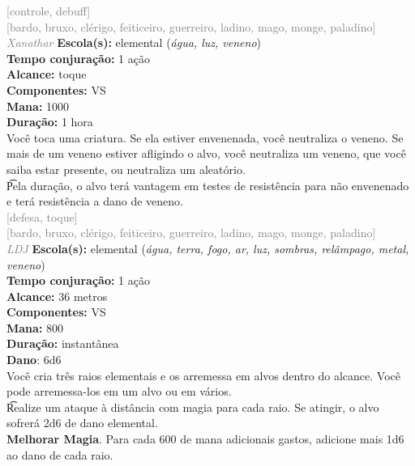 \documentclass{RPG_Adventure}[2021/10/20]
\begin{document}
{\scriptsize \textcolor{gray}{[controle, debuff]\\}}
{\scriptsize \textcolor{gray}{[bardo, bruxo, clérigo, feiticeiro, guerreiro, ladino, mago, monge, paladino]\\}}
{\tiny \textcolor{gray}{\textit{Xanathar}}}
{\small \t \textbf{Escola(s):} elemental (\textit{água, luz, veneno})\\\t \textbf{Tempo conjuração:} 1 ação\\\t \textbf{Alcance:} toque\\\t \textbf{Componentes:} VS\\\t \textbf{Mana:} 1000\\\t \textbf{Duração:} 1 hora\\}
{\normalsize Você toca uma criatura. Se ela estiver envenenada, você neutraliza o veneno. Se mais de um veneno estiver afligindo o alvo, você neutraliza um veneno, que você saiba estar presente, ou neutraliza um aleatório.\\\t Pela duração, o alvo terá vantagem em testes de resistência para não envenenado e terá resistência a dano de veneno.\\}
{\scriptsize \textcolor{gray}{[defesa, toque]\\}}
{\scriptsize \textcolor{gray}{[bardo, bruxo, clérigo, feiticeiro, guerreiro, ladino, mago, monge, paladino]\\}}
{\tiny \textcolor{gray}{\textit{LDJ}}}
{\small \t \textbf{Escola(s):} elemental (\textit{água, terra, fogo, ar, luz, sombras, relâmpago, metal, veneno})\\\t \textbf{Tempo conjuração:} 1 ação\\\t \textbf{Alcance:} 36 metros\\\t \textbf{Componentes:} VS\\\t \textbf{Mana:} 800\\\t \textbf{Duração:} instantânea\\\t \textbf{Dano}: 6d6\\}
{\normalsize Você cria três raios elementais e os arremessa em alvos dentro do alcance. Você pode arremessa-los em um alvo ou em vários.\\\t Realize um ataque à distância com magia para cada raio. Se atingir, o alvo sofrerá 2d6 de dano elemental.\\\t \textbf{Melhorar Magia}. Para cada 600 de mana adicionais gastos, adicione mais 1d6 ao dano de cada raio.\\}
\end{document}
